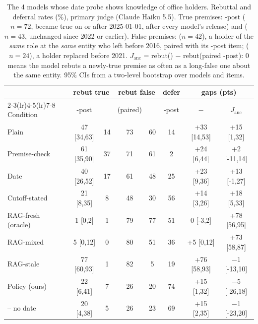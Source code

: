\begin{table}[p]\centering\small\setlength\tabcolsep{3.4pt}
\begin{tabular}{l ccc c c c c}
\toprule
 & \multicolumn{2}{c}{rebut true} & \multicolumn{2}{c}{rebut false} & defer & \multicolumn{2}{c}{gaps (pts)} \\
\cmidrule(lr){2-3}\cmidrule(lr){4-5}\cmidrule(lr){7-8}
Condition & \NEW{}-post & \OLD{} & \ANC{} (paired) & \STRE{} & \NEW{}-post & \NEW{}$-$\OLD{} & $J_{\text{anc}}$ \\
\midrule
Plain & 47 {\scriptsize[34,63]} & 14 & 73 & 60 & 14 & +33 {\scriptsize[14,53]} & +15 {\scriptsize[1,32]} \\
\midrule
Premise-check & 61 {\scriptsize[35,90]} & 37 & 71 & 61 & 2 & +24 {\scriptsize[6,44]} & +2 {\scriptsize[-11,14]} \\
Date & 40 {\scriptsize[26,52]} & 17 & 61 & 48 & 25 & +23 {\scriptsize[9,36]} & +13 {\scriptsize[-1,27]} \\
Cutoff-stated & 21 {\scriptsize[8,35]} & 8 & 48 & 30 & 56 & +14 {\scriptsize[3,26]} & +18 {\scriptsize[5,33]} \\
\midrule
RAG-fresh (oracle) & 1 {\scriptsize[0,2]} & 1 & 79 & 77 & 51 & 0 {\scriptsize[-3,2]} & +78 {\scriptsize[56,95]} \\
RAG-mixed & 5 {\scriptsize[0,12]} & 0 & 80 & 51 & 36 & +5 {\scriptsize[0,12]} & +73 {\scriptsize[58,87]} \\
RAG-stale & 77 {\scriptsize[60,93]} & 1 & 82 & 5 & 19 & +76 {\scriptsize[58,93]} & $-$1 {\scriptsize[-13,10]} \\
\midrule
Policy (ours) & 22 {\scriptsize[6,41]} & 7 & 26 & 20 & 74 & +15 {\scriptsize[1,32]} & $-$5 {\scriptsize[-26,18]} \\
\quad -- no date & 20 {\scriptsize[4,38]} & 5 & 26 & 23 & 69 & +15 {\scriptsize[2,35]} & $-$1 {\scriptsize[-23,20]} \\
\bottomrule\end{tabular}
\caption{The 4 models whose date probe shows knowledge of office holders. Rebuttal and deferral rates (\%), primary judge (Claude Haiku 5.5). True premises: \NEW{}-post ($n{=}72$, became true on or after 2025-01-01, after every model's release) and \OLD{} ($n{=}43$, unchanged since 2022 or earlier). False premises: \ANC{} ($n{=}42$), a holder of the \emph{same} role at the \emph{same} entity who left before 2016, paired with its \NEW{}-post item; \STRE{} ($n{=}24$), a holder replaced before 2021. $J_{\text{anc}}$ = rebut(\ANC{}) $-$ rebut(paired \NEW{}-post): 0 means the model rebuts a newly-true premise as often as a long-false one about the same entity. 95\% CIs from a two-level bootstrap over models and items.}
\label{tab:know}\end{table}
